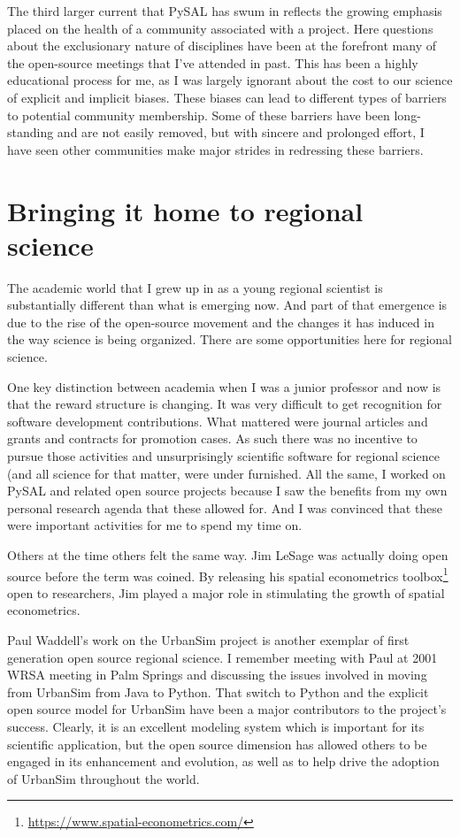 \documentclass[11pt]{article}
\begin{document}
The third larger current that PySAL has swum in reflects the growing emphasis
placed on the health of a community associated with a project. Here questions
about the exclusionary nature of disciplines have been at the forefront many of
the open-source meetings that I've attended in past. This has been a highly
educational process for me, as I was largely ignorant about the cost to our
science of explicit and implicit biases. These biases can lead to different
types of barriers to potential community membership. Some of these barriers
have been long-standing and are not easily removed, but with sincere and
prolonged effort, I have seen other communities make major strides in
redressing these barriers.
\section*{Bringing it home to regional science}
\label{sec:org2bffd42}
The academic world that I grew up in as a young regional scientist is
substantially different than what is emerging now. And part of that emergence
is due to the rise of the open-source movement and the changes it has induced in
the way science is being organized. There are some opportunities here for
regional science.

One key distinction between academia when I was a junior professor and now is
that the reward structure is changing. It was very difficult to get recognition
for software development contributions. What mattered were journal articles and
grants and contracts for promotion cases. As such there was no incentive to
pursue those activities and unsurprisingly scientific software for regional
science (and all science for that matter, were under furnished. All the same, I
worked on PySAL and related open source projects because I saw the benefits
from my own personal research agenda that these allowed for. And I was
convinced that these were important activities for me to spend my time on.

Others at the time others felt the same way. Jim LeSage was actually doing open
source before the term was coined. By releasing his spatial econometrics
toolbox\footnote{\url{https://www.spatial-econometrics.com/}} open to researchers, Jim played a major role in stimulating the growth
of spatial econometrics.


Paul Waddell's work on the UrbanSim project \citep{waddell_urbansim:_2002} is
another exemplar of first generation open source regional science. I remember
meeting with Paul at 2001 WRSA meeting in Palm Springs and discussing the
issues involved in moving from UrbanSim from Java to Python. That switch to
Python and the explicit open source model for UrbanSim have been a major
contributors to the project's success. Clearly, it is an excellent modeling
system which is important for its scientific application, but the open source
dimension has allowed others to be engaged in its enhancement and evolution, as
well as to help drive the adoption of UrbanSim throughout the world.
\end{document}
